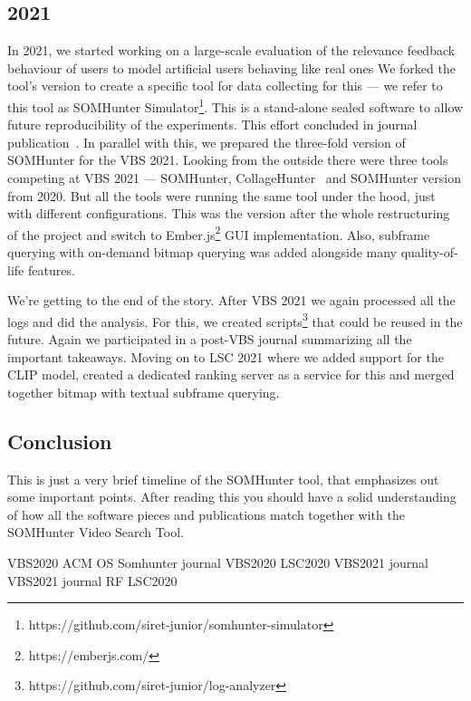 \subsection{2021}
In 2021, we started working on a large-scale evaluation of the relevance feedback behaviour of users to model artificial users behaving like real ones We forked the tool's version to create a specific tool for data collecting for this --- we refer to this tool as SOMHunter Simulator\footnote{https://github.com/siret-junior/somhunter-simulator}. This is a stand-alone sealed software to allow future reproducibility of the experiments. This effort concluded in journal publication~\cite{journalRF}. In parallel with this, we prepared the three-fold version of SOMHunter for the VBS 2021. Looking from the outside there were three tools competing at VBS 2021 --- SOMHunter, CollageHunter~\cite{lokovc2021video} and SOMHunter version from 2020. But all the tools were running the same tool under the hood, just with different configurations. This was the version after the whole restructuring of the project and switch to Ember.js\footnote{https://emberjs.com/} GUI implementation. Also, subframe querying with on-demand bitmap querying was added alongside many quality-of-life features.

We're getting to the end of the story. After VBS 2021 we again processed all the logs and did the analysis. For this, we created scripts\footnote{https://github.com/siret-junior/log-analyzer} that could be reused in the future. Again we participated in a post-VBS journal summarizing all the important takeaways. Moving on to LSC 2021 where we added support for the CLIP model, created a dedicated ranking server as a service for this and merged together bitmap with textual subframe querying. 

\subsection{Conclusion}
This is just a very brief timeline of the SOMHunter tool, that emphasizes out some important points. After reading this you should have a solid understanding of how all the software pieces and publications match together with the SOMHunter Video Search Tool.


VBS2020\cite{kratochvil2020som}
ACM OS Somhunter \cite{kratochvil2020somhunter}
journal VBS2020\cite{lokovc2021reign}
LSC2020\cite{mejzlik2020somhunter}
VBS2021\cite{vesely2021somhunter}
journal VBS2021\cite{journalvbs2021}
journal RF \cite{journalRF}
LSC2020\cite{lokovc2021enhanced}


